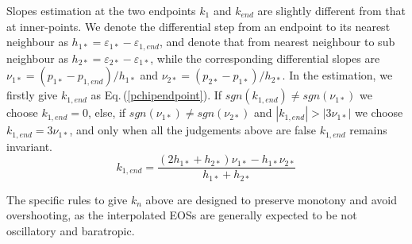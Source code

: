 \documentclass[aps,prl,a4paper,twocolumn,floats,amsmath,amssymb,nofootinbib,showpacs]{revtex4-1}
\begin{document}
Slopes estimation at the two endpoints $k_1$ and $k_{end}$ are slightly different from that at inner-points. We denote the differential step from an endpoint to its nearest neighbour as $h_{1*}=\varepsilon_{1*}-\varepsilon_{1,end}$, and denote that from nearest neighbour to sub neighbour as $h_{2*}=\varepsilon_{2*}-\varepsilon_{1*}$, while the corresponding differential slopes are $\nu _{1*}=(p_{1*}-p_{1,end})/h_{1*}$ and $\nu _{2*}=(p_{2*}-p_{1*})/h_{2*}$. In the estimation, we firstly give $k_{1,end}$ as Eq.$\,$(\ref{pchipendpoint}). If $sgn(k_{1,end}) \ne sgn(\nu_{1*})$ we choose $k_{1,end}=0$, else, if $sgn(\nu_{1*}) \ne sgn(\nu_{2*})$ and $\left| k_{1,end} \right| > \left| 3\nu_{1*} \right|$ we choose $k_{1,end}=3\nu_{1*}$, and only when all the judgements above are false $k_{1,end}$ remains invariant.
\begin{equation} \label{pchipendpoint}
{k_{1,end}} = \frac{{\left( {2{h_{1*}} + {h_{2*}}} \right){\nu _{1*}} - {h_{1*}}{\nu _{2*}}}}{{{h_{1*}} + {h_{2*}}}}
\end{equation}

The specific rules to give $k_{n}$ above are designed to preserve monotony and avoid overshooting, as the interpolated EOSs are generally expected to be not oscillatory and baratropic.
\end{document}
